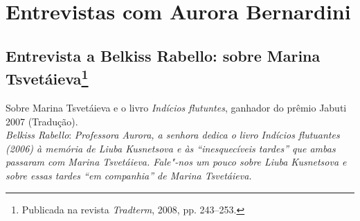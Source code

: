 {\part{Entrevistas com Aurora Bernardini}

\chapter{Entrevista a Belkiss Rabello: sobre Marina Tsvetáieva\footnote{Publicada na revista
  \emph{Tradterm}, 2008, pp. 243--253.}}

Sobre Marina Tsvetáieva e o livro \emph{Indícios flutuntes}, ganhador do
prêmio Jabuti 2007 (Tradução). \\

\noindent
\emph{Belkiss Rabello}: \emph{Professora Aurora, a senhora dedica o
livro \emph{Indícios flutuantes} (2006) à memória de Liuba Kusnetsova e
às ``inesquecíveis tardes'' que ambas passaram com Marina Tsvetáieva.
Fale"-nos um pouco sobre Liuba Kusnetsova e sobre essas tardes ``em
companhia'' de Marina Tsvetáieva.}

}
